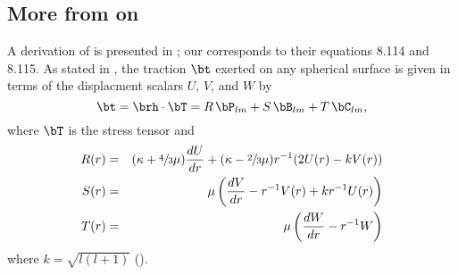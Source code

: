 \documentclass[11pt,titlepage,fleqn]{article}
\begin{document}




\subsection{More from \cite{DT} on }
\label{sec:ODEs}

A derivation of  is presented in \citet{DT}; our  corresponds to their equations 8.114 and 8.115. As stated in \citet[][p.~270]{DT}, the traction $\bt$ exerted on any spherical surface is given in terms of the displacment scalars $U$, $V$, and $W$ by
%
\begin{equation}
\bt = \brh \cdot \bT = R\,\bP_{lm} + S\,\bB_{lm} + T\,\bC_{lm},
\end{equation}
%
where $\bT$ is the stress tensor and
%
\begin{eqnarray}
R(r) &=& (\kappa + \sfrac{4}{3}\mu)\frac{d U}{d r} + (\kappa - \sfrac{2}{3}\mu)r^{-1}(2 U(r) - k V(r))
\\
S(r) &=& \mu \left( \frac{d V}{d r} - r^{-1} V(r) + kr^{-1}U(r) \right)
\\
T(r) &=& \mu \left( \frac{d W}{d r} - r^{-1} W \right)
\label{Tr}
\end{eqnarray}
%
where $k = \sqrt{l(l+1)}$ ().
\end{document}
